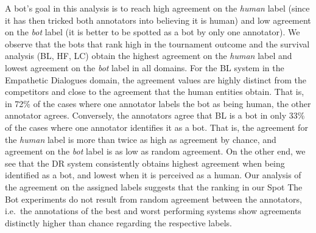 \documentclass[11pt,a4paper]{article}
\begin{document}
A bot's goal in this analysis is to reach high agreement on the \emph{human} label (since it has then tricked both annotators into believing it is human) and low agreement on the \emph{bot} label (it is better to be spotted as a bot by only one annotator). 
We observe that the bots that rank high in the tournament outcome and the survival analysis (BL, HF, LC) obtain the highest agreement on the \emph{human} label and lowest agreement on the \emph{bot} label in all domains. For the BL system in the Empathetic Dialogues domain, the agreement values are highly distinct from the competitors and close to the agreement that the human entities obtain. That is, in 72\% of the cases where one annotator labels the bot as being human, the other annotator agrees. Conversely, the annotators agree that BL is a bot in only 33\% of the cases where one annotator identifies it as a bot. That is, the agreement for the \emph{human} label is more than twice as high as agreement by chance, and agreement on the \emph{bot} label is as low as random agreement. On the other end, we see that the DR system consistently obtains highest agreement when being identified as a bot, and lowest when it is perceived as a human. 
Our analysis of the agreement on the assigned labels suggests that the ranking in our Spot The Bot experiments do not result from random agreement between the annotators, i.e.\ the annotations of the best and worst performing systems show agreements distinctly higher than chance regarding the respective labels. 
\end{document}
